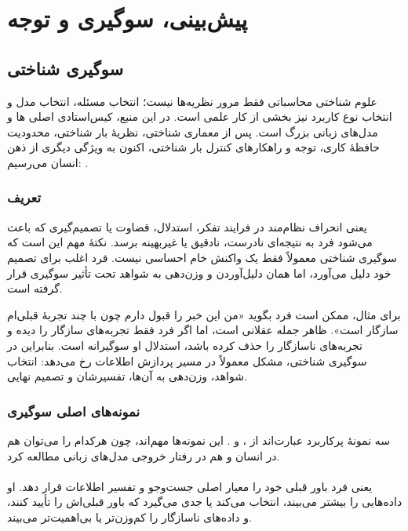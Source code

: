 \chapter{پیش‌بینی، سوگیری و توجه}

\section{سوگیری شناختی}

علوم شناختی محاسباتی فقط مرور نظریه‌ها نیست؛ انتخاب مسئله، انتخاب مدل و انتخاب نوع کاربرد نیز بخشی از کار علمی است. در این منبع، کیس‌استادی اصلی ها و مدل‌های زبانی بزرگ است. پس از معماری شناختی، نظریهٔ بار شناختی، محدودیت حافظهٔ کاری، توجه و راهکارهای کنترل بار شناختی، اکنون به ویژگی دیگری از ذهن انسان می‌رسیم: .

\subsection{تعریف }
 یعنی انحراف نظام‌مند در فرایند تفکر، استدلال، قضاوت یا تصمیم‌گیری که باعث می‌شود فرد به نتیجه‌ای نادرست، نادقیق یا غیربهینه برسد. نکتهٔ مهم این است که سوگیری شناختی معمولاً فقط یک واکنش خام احساسی نیست. فرد اغلب برای تصمیم خود دلیل می‌آورد، اما همان دلیل‌آوردن و وزن‌دهی به شواهد تحت تأثیر سوگیری قرار گرفته است.

برای مثال، ممکن است فرد بگوید «من این خبر را قبول دارم چون با چند تجربهٔ قبلی‌ام سازگار است». ظاهر جمله عقلانی است، اما اگر فرد فقط تجربه‌های سازگار را دیده و تجربه‌های ناسازگار را حذف کرده باشد، استدلال او سوگیرانه است. بنابراین در سوگیری شناختی، مشکل معمولاً در مسیر پردازش اطلاعات رخ می‌دهد: انتخاب شواهد، وزن‌دهی به آن‌ها، تفسیرشان و تصمیم نهایی.

\subsection{نمونه‌های اصلی سوگیری}
سه نمونهٔ پرکاربرد عبارت‌اند از ،  و . این نمونه‌ها مهم‌اند، چون هرکدام را می‌توان هم در انسان و هم در رفتار خروجی مدل‌های زبانی مطالعه کرد.

\subsubsection{}
 یعنی فرد باور قبلی خود را معیار اصلی جست‌وجو و تفسیر اطلاعات قرار دهد. او داده‌هایی را بیشتر می‌بیند، انتخاب می‌کند یا جدی می‌گیرد که باور قبلی‌اش را تأیید کنند، و داده‌های ناسازگار را کم‌وزن‌تر یا بی‌اهمیت‌تر می‌بیند.

